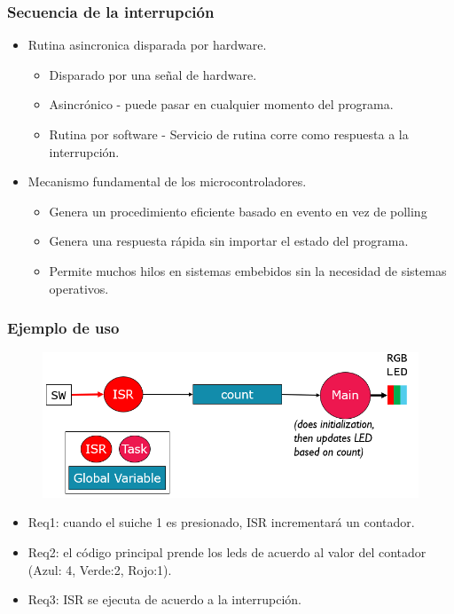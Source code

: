 \documentclass[10.5pt,scale=1.0,t,aspectratio=169,hyperref={pdfpagelabels=false}]{beamer}
\begin{document}
\begin{frame}
	\frametitle{Secuencia de la interrupción}
	\begin{itemize}
		\item Rutina asincronica disparada por hardware.
		\begin{itemize}
			\item Disparado por una señal de hardware.
			\item Asincrónico - puede pasar en cualquier momento del programa. 
			\item Rutina por software - Servicio de rutina corre como respuesta a la interrupción. 
		\end{itemize}
		\item Mecanismo fundamental de los microcontroladores.
		\begin{itemize}
			\item Genera un procedimiento eficiente basado en evento en vez de polling
			\item Genera una respuesta rápida sin importar el estado del programa.
			\item Permite muchos hilos en sistemas embebidos sin la necesidad de sistemas operativos. 
		\end{itemize}
	\end{itemize}
\end{frame}
\begin{frame}
	\frametitle{Ejemplo de uso}
	\begin{figure}
		\centering
		\includegraphics[scale=0.4]{03_EjemploInt}
	\end{figure}
	\begin{itemize}
		\item Req1: cuando el suiche 1 es presionado, ISR incrementará un contador.
		\item Req2: el código principal prende los leds de acuerdo al valor del contador (Azul: 4, Verde:2, Rojo:1).
		\item Req3: ISR se ejecuta de acuerdo a la interrupción. 
	\end{itemize}
\end{frame}
\end{document}

